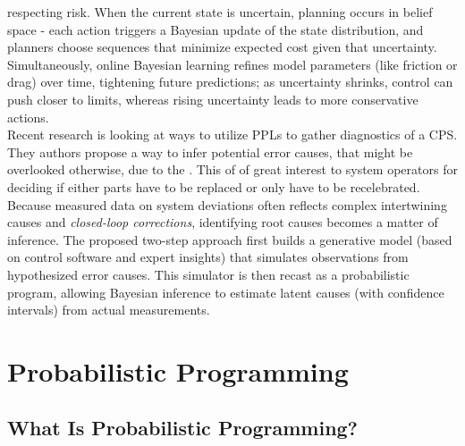 \begin{multicols}{2}
  respecting risk. When the current state is uncertain, planning occurs in belief space - each action triggers a Bayesian update of the state distribution, and planners
  choose sequences that minimize expected cost given that uncertainty. Simultaneously, online Bayesian learning refines model parameters (like friction or drag) over time,
  tightening future predictions; as uncertainty shrinks, control can push closer to limits, whereas rising uncertainty leads to more conservative actions.
  \\
  Recent research is looking at ways to utilize PPLs to gather diagnostics of a CPS. \cite{cpsPPLDiagnostics} They authors propose a way to infer potential error causes, that
  might be overlooked otherwise, due to the .
  This of of great interest to system operators for deciding if either parts have to be replaced or only have to be recelebrated. Because measured data on system deviations
  often reflects complex intertwining causes and \textit{closed-loop corrections}, identifying root causes becomes a matter of inference. The proposed two-step approach
  first builds a generative model (based on control software and expert insights) that simulates observations from hypothesized error causes. This simulator is then recast
  as a probabilistic program, allowing Bayesian inference to estimate latent causes (with confidence intervals) from actual measurements.

\end{multicols}

\label{sec:pp}
\chapter{Probabilistic Programming}
\section{What Is Probabilistic Programming?}

